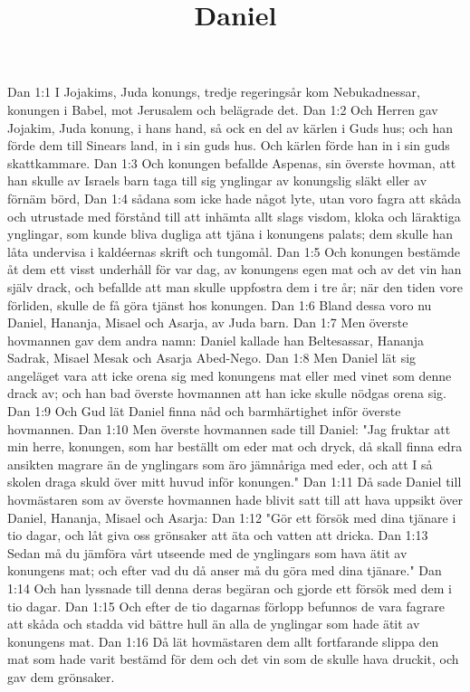 

\title{Daniel}

Dan 1:1  I Jojakims, Juda konungs, tredje regeringsår kom Nebukadnessar, konungen i Babel, mot Jerusalem och belägrade det.
Dan 1:2  Och Herren gav Jojakim, Juda konung, i hans hand, så ock en del av kärlen i Guds hus; och han förde dem till Sinears land, in i sin guds hus. Och kärlen förde han in i sin guds skattkammare.
Dan 1:3  Och konungen befallde Aspenas, sin överste hovman, att han skulle av Israels barn taga till sig ynglingar av konungslig släkt eller av förnäm börd,
Dan 1:4  sådana som icke hade något lyte, utan voro fagra att skåda och utrustade med förstånd till att inhämta allt slags visdom, kloka och läraktiga ynglingar, som kunde bliva dugliga att tjäna i konungens palats; dem skulle han låta undervisa i kaldéernas skrift och tungomål.
Dan 1:5  Och konungen bestämde åt dem ett visst underhåll för var dag, av konungens egen mat och av det vin han själv drack, och befallde att man skulle uppfostra dem i tre år; när den tiden vore förliden, skulle de få göra tjänst hos konungen.
Dan 1:6  Bland dessa voro nu Daniel, Hananja, Misael och Asarja, av Juda barn.
Dan 1:7  Men överste hovmannen gav dem andra namn: Daniel kallade han Beltesassar, Hananja Sadrak, Misael Mesak och Asarja Abed-Nego.
Dan 1:8  Men Daniel lät sig angeläget vara att icke orena sig med konungens mat eller med vinet som denne drack av; och han bad överste hovmannen att han icke skulle nödgas orena sig.
Dan 1:9  Och Gud lät Daniel finna nåd och barmhärtighet inför överste hovmannen.
Dan 1:10  Men överste hovmannen sade till Daniel: "Jag fruktar att min herre, konungen, som har beställt om eder mat och dryck, då skall finna edra ansikten magrare än de ynglingars som äro jämnåriga med eder, och att I så skolen draga skuld över mitt huvud inför konungen."
Dan 1:11  Då sade Daniel till hovmästaren som av överste hovmannen hade blivit satt till att hava uppsikt över Daniel, Hananja, Misael och Asarja:
Dan 1:12  "Gör ett försök med dina tjänare i tio dagar, och låt giva oss grönsaker att äta och vatten att dricka.
Dan 1:13  Sedan må du jämföra vårt utseende med de ynglingars som hava ätit av konungens mat; och efter vad du då anser må du göra med dina tjänare."
Dan 1:14  Och han lyssnade till denna deras begäran och gjorde ett försök med dem i tio dagar.
Dan 1:15  Och efter de tio dagarnas förlopp befunnos de vara fagrare att skåda och stadda vid bättre hull än alla de ynglingar som hade ätit av konungens mat.
Dan 1:16  Då lät hovmästaren dem allt fortfarande slippa den mat som hade varit bestämd för dem och det vin som de skulle hava druckit, och gav dem grönsaker.
